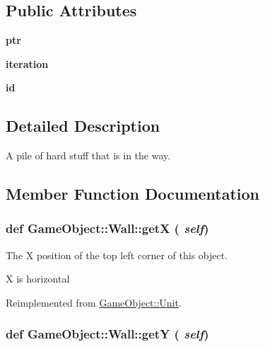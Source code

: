 \subsection*{Public Attributes}
\begin{DoxyCompactItemize}
\item 
\hypertarget{classGameObject_1_1Wall_aca77f48e399779816107f66d08db19ea}{
{\bfseries ptr}}
\label{classGameObject_1_1Wall_aca77f48e399779816107f66d08db19ea}

\item 
\hypertarget{classGameObject_1_1Wall_aeec50205498a30561831f88ec5816c9a}{
{\bfseries iteration}}
\label{classGameObject_1_1Wall_aeec50205498a30561831f88ec5816c9a}

\item 
\hypertarget{classGameObject_1_1Wall_ac238c673f341e4e5e51e811e4296c12b}{
{\bfseries id}}
\label{classGameObject_1_1Wall_ac238c673f341e4e5e51e811e4296c12b}

\end{DoxyCompactItemize}


\subsection{Detailed Description}
A pile of hard stuff that is in the way. 

\subsection{Member Function Documentation}
\hypertarget{classGameObject_1_1Wall_aa8d092fd75ef8372aacf4ece64521ea8}{
\subsubsection[{getX}]{\setlength{\rightskip}{0pt plus 5cm}def GameObject::Wall::getX ( {\em self})}}
\label{classGameObject_1_1Wall_aa8d092fd75ef8372aacf4ece64521ea8}


The X position of the top left corner of this object. 

X is horizontal 

Reimplemented from \hyperlink{classGameObject_1_1Unit_a01711efd87c7e3e2a97066e9a5c50da5}{GameObject::Unit}.

\hypertarget{classGameObject_1_1Wall_ac87b620714dfacc5ac12ca6078a91460}{
\subsubsection[{getY}]{\setlength{\rightskip}{0pt plus 5cm}def GameObject::Wall::getY ( {\em self})}}
\label{classGameObject_1_1Wall_ac87b620714dfacc5ac12ca6078a91460}


